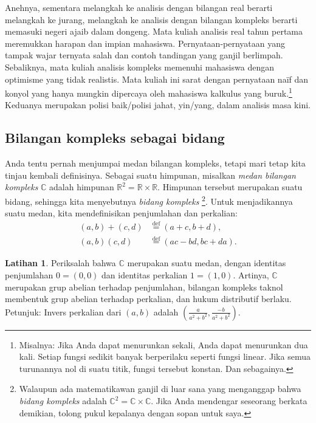 \documentclass[12pt,openany]{book}
\newcommand{\C}{{\mathbb{C}}}
\newcommand{\R}{{\mathbb{R}}}
\newcommand{\myindex}[1]{#1\index{#1}}
\theoremstyle{plain}
\theoremstyle{remark}
\theoremstyle{definition}
\newenvironment{exbox}{%
    \def\FrameCommand{\vrule width 1pt \relax\hspace{10pt}}%
    \MakeFramed{\advance\hsize-\width\FrameRestore}%
}{%
    \endMakeFramed
}
\theoremstyle{exercise}
\newtheorem{exercise}{Latihan}[section]
\theoremstyle{example}
\begin{document}
Anehnya, sementara melangkah ke analisis dengan bilangan real
berarti melangkah ke jurang, melangkah ke analisis dengan bilangan kompleks berarti
memasuki negeri ajaib dalam dongeng.  Mata kuliah analisis real tahun pertama
meremukkan harapan dan impian mahasiswa.  Pernyataan-pernyataan yang tampak wajar
ternyata salah dan contoh tandingan yang ganjil berlimpah.
Sebaliknya, mata kuliah analisis kompleks memenuhi mahasiswa dengan
optimisme yang tidak realistis.  Mata kuliah ini sarat dengan pernyataan na\"if dan konyol
yang hanya mungkin dipercaya oleh mahasiswa kalkulus yang buruk.\footnote{%
Misalnya: Jika Anda dapat menurunkan sekali, Anda dapat menurunkan dua kali.
Setiap fungsi sedikit banyak berperilaku seperti fungsi linear.
Jika semua turunannya nol di suatu titik, fungsi tersebut konstan.
Dan sebagainya.}
Keduanya merupakan polisi baik/polisi jahat, yin/yang,
dalam analisis masa kini.

\subsection{Bilangan kompleks sebagai bidang}

Anda tentu pernah menjumpai medan bilangan kompleks,
tetapi mari tetap kita tinjau kembali definisinya.
Sebagai suatu himpunan, misalkan \emph{\myindex{medan bilangan kompleks}}
$\C$ adalah himpunan $\R^2 = \R \times \R$.
Himpunan tersebut merupakan suatu bidang, sehingga kita menyebutnya \emph{\myindex{bidang kompleks}}%
\footnote{Walaupun ada matematikawan ganjil di luar sana yang
menganggap bahwa \emph{bidang kompleks} adalah $\C^2 = \C \times \C$.
Jika Anda mendengar seseorang berkata demikian, tolong pukul kepalanya dengan sopan untuk saya.}.
Untuk menjadikannya suatu medan, kita mendefinisikan penjumlahan dan perkalian:
\begin{align*}
(a,b) + (c,d) & \overset{\text{def}}{=} (a+c,b+d) , \\
(a,b) (c,d) & \overset{\text{def}}{=} (ac-bd,bc+da) .
\end{align*}

\begin{exbox}
\begin{exercise}%
Periksalah bahwa $\C$ merupakan suatu medan, dengan identitas
penjumlahan $0=(0,0)$ dan identitas perkalian $1=(1,0)$.
Artinya, $\C$ merupakan grup abelian terhadap penjumlahan,
bilangan kompleks taknol membentuk grup abelian terhadap perkalian,
dan hukum distributif berlaku.  Petunjuk: Invers perkalian dari $(a,b)$
adalah $\left(\frac{a}{a^2+b^2},\frac{-b}{a^2+b^2}\right)$.
\end{exercise}
\end{exbox}
\end{document}
